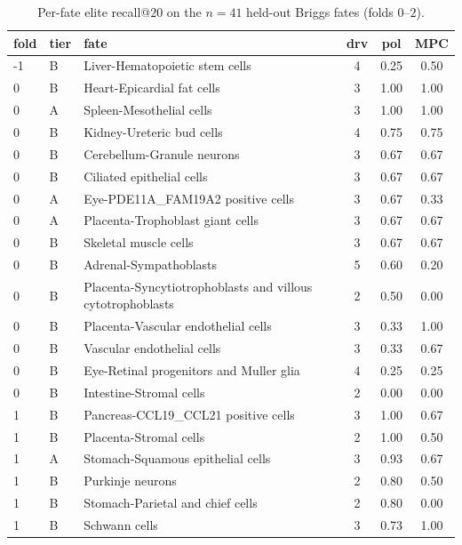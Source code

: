 \begin{table}[h]\centering\scriptsize
\caption{Per-fate elite recall@$20$ on the $n{=}41$ held-out Briggs fates (folds $0$--$2$).}
\label{tab:fatelist}
\begin{minipage}[t]{0.49\linewidth}\centering
\begin{tabular}{@{}llp{2.6cm}ccc@{}}
\toprule
fold & tier & fate & drv & pol & MPC \\
\midrule
-1 & B & Liver-Hematopoietic stem cells & 4 & 0.25 & 0.50 \\
0 & B & Heart-Epicardial fat cells & 3 & 1.00 & 1.00 \\
0 & A & Spleen-Mesothelial cells & 3 & 1.00 & 1.00 \\
0 & B & Kidney-Ureteric bud cells & 4 & 0.75 & 0.75 \\
0 & B & Cerebellum-Granule neurons & 3 & 0.67 & 0.67 \\
0 & B & Ciliated epithelial cells & 3 & 0.67 & 0.67 \\
0 & A & Eye-PDE11A\_FAM19A2 positive cells & 3 & 0.67 & 0.33 \\
0 & A & Placenta-Trophoblast giant cells & 3 & 0.67 & 0.67 \\
0 & B & Skeletal muscle cells & 3 & 0.67 & 0.67 \\
0 & B & Adrenal-Sympathoblasts & 5 & 0.60 & 0.20 \\
0 & B & Placenta-Syncytiotrophoblasts and villous cytotrophoblasts & 2 & 0.50 & 0.00 \\
0 & B & Placenta-Vascular endothelial cells & 3 & 0.33 & 1.00 \\
0 & B & Vascular endothelial cells & 3 & 0.33 & 0.67 \\
0 & B & Eye-Retinal progenitors and Muller glia & 4 & 0.25 & 0.25 \\
0 & B & Intestine-Stromal cells & 2 & 0.00 & 0.00 \\
1 & B & Pancreas-CCL19\_CCL21 positive cells & 3 & 1.00 & 0.67 \\
1 & B & Placenta-Stromal cells & 2 & 1.00 & 0.50 \\
1 & A & Stomach-Squamous epithelial cells & 3 & 0.93 & 0.67 \\
1 & B & Purkinje neurons & 2 & 0.80 & 0.50 \\
1 & B & Stomach-Parietal and chief cells & 2 & 0.80 & 0.00 \\
1 & B & Schwann cells & 3 & 0.73 & 1.00 \\
\bottomrule
\end{tabular}
\end{minipage}\hfill

\end{table}
